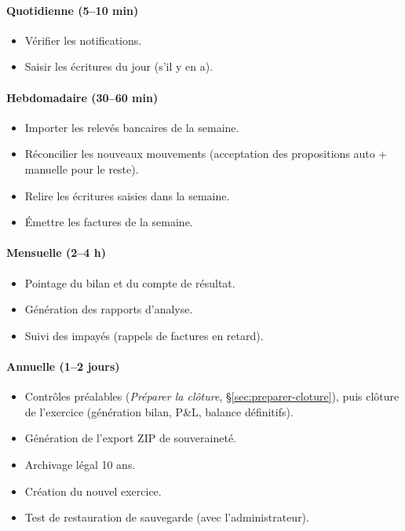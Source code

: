 \documentclass[a4paper,11pt,oneside]{article}
\begin{document}
\paragraph{Quotidienne (5--10 min)}
\begin{itemize}
    \item Vérifier les notifications.
    \item Saisir les écritures du jour (s'il y en a).
\end{itemize}

\paragraph{Hebdomadaire (30--60 min)}
\begin{itemize}
    \item Importer les relevés bancaires de la semaine.
    \item Réconcilier les nouveaux mouvements (acceptation des propositions auto + manuelle pour le reste).
    \item Relire les écritures saisies dans la semaine.
    \item Émettre les factures de la semaine.
\end{itemize}

\paragraph{Mensuelle (2--4 h)}
\begin{itemize}
    \item Pointage du bilan et du compte de résultat.
    \item Génération des rapports d'analyse.
    \item Suivi des impayés (rappels de factures en retard).
\end{itemize}

\paragraph{Annuelle (1--2 jours)}
\begin{itemize}
    \item Contrôles préalables (\emph{Préparer la clôture}, \S\ref{sec:preparer-cloture}), puis clôture de l'exercice (génération bilan, P\&L, balance définitifs).
    \item Génération de l'export ZIP de souveraineté.
    \item Archivage légal 10 ans.
    \item Création du nouvel exercice.
    \item Test de restauration de sauvegarde (avec l'administrateur).
\end{itemize}
\end{document}
